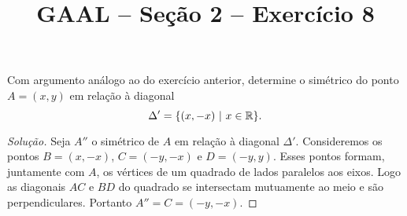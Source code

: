 \documentclass[a4paper,11pt]{article}
\title{GAAL -- Seção 2 -- Exercício 8}
\author{\empty}
\date{\empty}
\newcommand\onlyinsubfileone\maketitle
\begin{document}
\onlyinsubfileone

\begin{exercicio-gaal}[E8.S2]
  Com argumento análogo ao do exercício anterior, determine o simétrico do ponto $A = (x,y)$ em relação à diagonal
  \[
    \Delta' = \{(x,-x) \ | \ x \in \R\}.
  \]
\end{exercicio-gaal}

\begin{proof}[Solução]
  Seja $A''$ o simétrico de $A$ em relação à diagonal $\Delta'$.
  Consideremos os pontos $B = (x,-x)$, $C = (-y,-x)$ e $D = (-y,y)$.
  Esses pontos formam, juntamente com $A$, os vértices de um quadrado de lados paralelos aos eixos.
  Logo as diagonais $AC$ e $BD$ do quadrado se intersectam mutuamente ao meio e são perpendiculares.
  Portanto $A'' = C = (-y,-x)$.
\end{proof}
\end{document}
